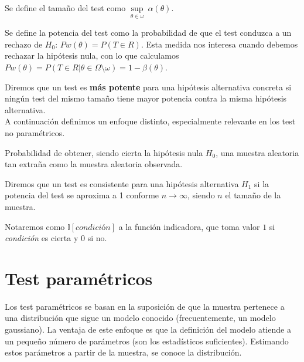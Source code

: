 \begin{definicion}
	Se define el tamaño del test como $\underset{\theta \in 
	\omega}{\sup}\ \alpha(\theta)$.
\end{definicion}

\begin{definicion}
	Se define la potencia del test como la probabilidad de 
que el test conduzca a un rechazo de $H_0$: $Pw(\theta) = P(T 
\in R)$. Esta medida nos interesa cuando debemos rechazar la 
hipótesis nula, con lo que calculamos $Pw(\theta) = P(T \in R 
| \theta \in \Omega \setminus \omega) = 1 - \beta(\theta)$. 
\end{definicion}
	
	Diremos que un test es \textbf{más potente} para una 
hipótesis alternativa concreta si ningún test del mismo 
tamaño tiene mayor potencia contra la misma hipótesis 
alternativa.\\
	A continuación definimos un enfoque distinto,
especialmente relevante en los test no paramétricos. 
	
\begin{definicion}[$p$-valor]
	Probabilidad de obtener, siendo cierta la hipótesis nula 
$H_0$, una muestra aleatoria tan extraña como la muestra
aleatoria observada.
\end{definicion}

\begin{definicion}[Consistencia]
	Diremos que un test es consistente para una hipótesis 
alternativa $H_1$ si la potencia del test se aproxima a 1 
conforme $n \rightarrow \infty$, siendo $n$ el tamaño de la 
muestra.
\end{definicion}

	Notaremos como $\mathbb{I}[\textit{condición}]$ a la 
función indicadora, que toma valor $1$ si \textit{condición} es
cierta y 0 si no.
	
	
\section{Test paramétricos}

	Los test paramétricos se basan en la suposición de que la
muestra pertenece a una distribución que sigue un modelo 
conocido (frecuentemente, un modelo gaussiano). La ventaja de 
este enfoque es que la definición del modelo atiende a un 
pequeño número de parámetros (son los estadísticos 
suficientes). Estimando estos parámetros a partir de la 
muestra, se conoce la distribución. 
	
